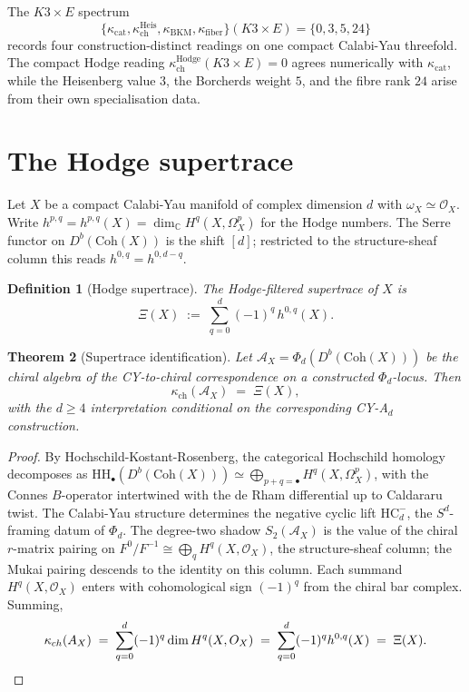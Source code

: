 \documentclass[11pt]{article}
\newtheorem{theorem}{Theorem}[section]
\newtheorem{definition}[theorem]{Definition}
\providecommand{\C}{\mathbb{C}}
\providecommand{\cA}{\mathcal{A}}
\providecommand{\cO}{\mathcal{O}}
\providecommand{\Coh}{\mathrm{Coh}}
\providecommand{\HH}{\mathrm{HH}}
\providecommand{\HC}{\mathrm{HC}}
\begin{document}
The \(K3\times E\) spectrum
\[
  \{\kappa_{\mathrm{cat}},\kappa_{\mathrm{ch}}^{\mathrm{Heis}},
    \kappa_{\mathrm{BKM}},\kappa_{\mathrm{fiber}}\}(K3\times E)
  =\{0,3,5,24\}
\]
records four construction-distinct readings on one compact
Calabi-Yau threefold. The compact Hodge reading
\(\kappa_{\mathrm{ch}}^{\mathrm{Hodge}}(K3\times E)=0\) agrees
numerically with \(\kappa_{\mathrm{cat}}\), while the Heisenberg value
\(3\), the Borcherds weight \(5\), and the fibre rank \(24\) arise from
their own specialisation data.

\section{The Hodge supertrace}
\label{sec:hodge-supertrace}

Let $X$ be a compact Calabi-Yau manifold of complex dimension $d$ with
$\omega_X\simeq\cO_X$. Write $h^{p,q}=h^{p,q}(X)=\dim_{\C}H^q(X,\Omega^p_X)$
for the Hodge numbers. The Serre functor on $D^{b}(\Coh(X))$ is the
shift $[d]$; restricted to the structure-sheaf column this reads
$h^{0,q}=h^{0,d-q}$.

\begin{definition}[Hodge supertrace]
\label{def:xi}
The Hodge-filtered supertrace of $X$ is
\[
   \Xi(X)\;:=\;\sum_{q=0}^{d}(-1)^{q}\,h^{0,q}(X).
\]
\end{definition}

\begin{theorem}[Supertrace identification]
\label{thm:supertrace}
Let $\cA_X=\Phi_d(D^{b}(\Coh(X)))$ be the chiral algebra of the
CY-to-chiral correspondence on a constructed \(\Phi_d\)-locus. Then
\[
   \kappa_{\mathrm{ch}}(\cA_X)\;=\;\Xi(X),
\]
with the \(d\ge 4\) interpretation conditional on the corresponding
CY-A$_d$ construction.
\end{theorem}

\begin{proof}
By Hochschild-Kostant-Rosenberg, the categorical Hochschild
homology decomposes as
$\HH_{\bullet}(D^{b}(\Coh(X)))\simeq
\bigoplus_{p+q=\bullet}H^{q}(X,\Omega^{p}_{X})$,
with the Connes $B$-operator intertwined with the de Rham differential
up to Caldararu twist. The Calabi-Yau structure determines the negative
cyclic lift $\HC^{-}_{d}$, the $S^{d}$-framing datum of $\Phi_d$. The
degree-two shadow $S_{2}(\cA_X)$ is the value of the chiral $r$-matrix
pairing on $F^{0}/F^{-1}\cong\bigoplus_{q}H^{q}(X,\cO_X)$, the
structure-sheaf column; the Mukai pairing descends to the identity on
this column. Each summand $H^{q}(X,\cO_X)$ enters with cohomological sign
$(-1)^{q}$ from the chiral bar complex. Summing,
\[
   \kappa_{\mathrm{ch}}(\cA_X)\;=\;\sum_{q=0}^{d}(-1)^{q}\dim H^{q}(X,\cO_X)
   \;=\;\sum_{q=0}^{d}(-1)^{q}h^{0,q}(X)\;=\;\Xi(X). \qedhere
\]
\end{proof}
\end{document}
